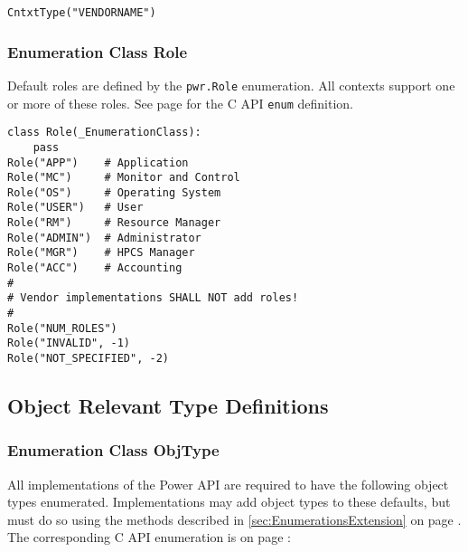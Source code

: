 \begin{center}\begin{minipage}{.95\linewidth}\begin{lstlisting}
CntxtType("VENDORNAME")
\end{lstlisting}\end{minipage}\end{center}

\subsubsection{Enumeration Class Role}\label{class:Role}

Default roles are defined by the \texttt{pwr.Role} enumeration. All
contexts support one or more of these roles. See page
\pageref{type:Role} for the C API \texttt{enum} definition.

\begin{center}\begin{minipage}{.95\linewidth}\begin{lstlisting}
class Role(_EnumerationClass):
    pass
Role("APP")    # Application
Role("MC")     # Monitor and Control
Role("OS")     # Operating System
Role("USER")   # User
Role("RM")     # Resource Manager
Role("ADMIN")  # Administrator
Role("MGR")    # HPCS Manager
Role("ACC")    # Accounting
#
# Vendor implementations SHALL NOT add roles!
#
Role("NUM_ROLES")
Role("INVALID", -1)
Role("NOT_SPECIFIED", -2)
\end{lstlisting}\end{minipage}\end{center}\label{sec:PythonPWRRoleDefinition}

\subsection{Object Relevant Type Definitions}
\label{sec:PythonObjectRelevantTypeDefinitions}

\subsubsection{Enumeration Class ObjType}\label{class:ObjType}

All implementations of the Power API are required to have the following object
types enumerated. Implementations may add object types to these defaults, but
must do so using the methods described in \ref{sec:EnumerationsExtension} on
page \pageref{sec:EnumerationsExtension}. The corresponding C API enumeration
is on page \pageref{type:ObjType}:

